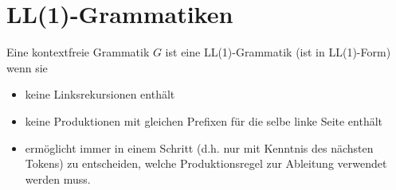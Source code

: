 {\begin{comment}
\path [->] (0) edge (1);
\path [->] (0) edge (2);
\path [->] (0) edge (3);

\path [->] (3) edge (4);
\path [->] (3) edge (5);
\path [->] (3) edge (6);

\path [->] (2) edge (7);
\path [->] (5) edge (8);
\path [->] (6) edge (9);
\end{tikzpicture}
&
\begin{tikzpicture}[node distance=1.9cm, auto]
\node [state] (0) {E};

\node [state, below of=0, accepting] (1) {\u{*}};
\node [state, left of=1] (3) {E};
\node [state, right of=1] (2) {E};

\node [state, below of=3, accepting] (4) {\u{+}};
\node [state, left of=4] (5) {E};
\node [state, right of=4] (6) {E};

\node [state, below of=2, accepting] (7) {\u{num}};

\node [state, below of=5, accepting] (8) {\u{num}};
\node [state, below of=6, accepting] (9) {\u{num}};

\path [->] (0) edge (1);
\path [->] (0) edge (2);
\path [->] (0) edge (3);

\path [->] (3) edge (4);
\path [->] (3) edge (5);
\path [->] (3) edge (6);

\path [->] (2) edge (7);
\path [->] (5) edge (8);
\path [->] (6) edge (9);
\end{tikzpicture}
\end{tabular}

Das geparste Wort kann in den Blättern des Baumes von links nach rechts abgelesen werden. Hier ist die Mehrdeutigkeit ebenfalls sehr gut erkennbar.

Eine weitere Beobachtung ist, dass es ungünstig ist wenn es für unseren Parser nicht genügt dass aktuelle Token zu kennen sondern für das Parsing auch weitere nachfolgende Tokens ermittelt werden müssen.
Ist das Eingabewort \verb|num|, so haben wir 3 Regeln die alle zutreffen könnten (ohne Kenntnis der nachfolgenden Tokens).
\ifthenelse{\boolean{long}}{}{\end{comment}}
\section{LL(1)-Grammatiken}
\begin{defn}[LL(1)-Grammatik]
Eine kontextfreie Grammatik $G$ ist eine LL(1)-Grammatik (ist in LL(1)-Form) wenn sie
\begin{itemize}
\item keine Linksrekursionen enthält
\item keine Produktionen mit gleichen Prefixen für die selbe linke Seite enthält
\item ermöglicht immer in einem Schritt (d.h. nur mit Kenntnis des nächsten Tokens) zu entscheiden,
welche Produktionsregel zur Ableitung verwendet werden muss.
\end{itemize}
\end{defn}

